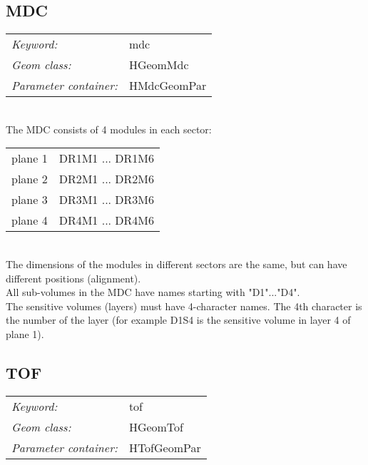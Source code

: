 \subsection*{MDC}

\begin{tabular}{ll}
\emph{Keyword:}             & mdc \\
\emph{Geom class:}          & HGeomMdc \\
\emph{Parameter container:} & HMdcGeomPar 
\end{tabular}\\

The MDC consists of 4 modules in each sector:\\
\begin{tabular}{ll}
plane 1 & DR1M1 ... DR1M6 \\
plane 2 & DR2M1 ... DR2M6 \\
plane 3 & DR3M1 ... DR3M6 \\
plane 4 & DR4M1 ... DR4M6
\end{tabular}\\
The dimensions of the modules in different sectors are the same, but can have different positions (alignment).\\
All sub-volumes in the MDC have names starting with "D1"..."D4".\\
The sensitive volumes (layers) must have 4-character names. The 4th character is the number of the layer (for example D1S4 
is the sensitive volume in layer 4 of plane 1).

\subsection*{TOF}

\begin{tabular}{ll}
\emph{Keyword:}             & tof \\
\emph{Geom class:}          & HGeomTof \\
\emph{Parameter container:} & HTofGeomPar 
\end{tabular}\\

